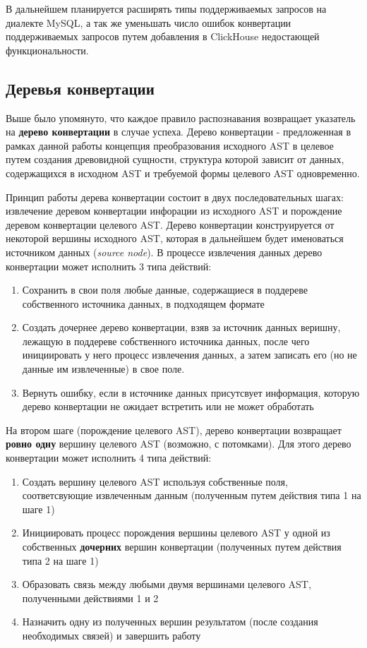 В дальнейшем планируется расширять типы поддерживаемых запросов на диалекте MySQL, а так же уменьшать число ошибок конвертации поддерживаемых запросов путем добавления в ClickHouse недостающей функциональности. 

\subsection{Деревья конвертации} \label{conv_tree}
Выше было упомянуто, что каждое правило распознавания возвращает указатель на \textbf{дерево конвертации} в случае успеха. Дерево конвертации - предложенная в рамках данной работы концепция преобразования исходного AST в целевое путем создания древовидной сущности, структура которой зависит от данных, содержащихся в исходном AST и требуемой формы целевого AST одновременно. 

Принцип работы дерева конвертации состоит в двух последовательных шагах: извлечение деревом конвертации инфорации из исходного AST и порождение деревом конвертации целевого AST. Дерево конвертации конструируется от некоторой вершины исходного AST, которая в дальнейшем будет именоваться источником данных (\textit{source node}). В процессе извлечения данных дерево конвертации может исполнить 3 типа действий:

\begin{enumerate}
    \item Сохранить в свои поля любые данные, содержащиеся в поддереве собственного источника данных, в подходящем формате
    \item Создать дочернее дерево конвертации, взяв за источник данных веришну, лежащую в поддереве собственного источника данных, после чего инициировать у него процесс извлечения данных, а затем записать его (но не данные им извлеченные) в свое поле. 
    \item Вернуть ошибку, если в источнике данных присутсвует информация, которую дерево конвертации не ожидает встретить или не может обработать
\end{enumerate}

На втором шаге (порождение целевого AST), дерево конвертации возвращает \textbf{ровно одну} вершину целевого AST (возможно, с потомками). Для этого дерево конвертации может исполнить 4 типа действий:

\begin{enumerate}
    \item Создать вершину целевого AST используя собственные поля, соответсвующие извлеченным данным (полученным путем действия типа 1 на шаге 1)
    \item Инициировать процесс порождения вершины целевого AST у одной из собственных \textbf{дочерних} вершин конвертации (полученных путем действия типа 2 на шаге 1)
    \item Образовать связь между любыми двумя вершинами целевого AST, полученными действиями 1 и 2
    \item Назначить одну из полученных вершин результатом (после создания необходимых связей) и завершить работу
\end{enumerate}

